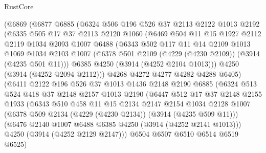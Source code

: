 \begin{lexlean}{RustCore}
\begin{coremodule}
        (@6869
          (@6877
            @6885
            (@6324
              @506
              @196
              @526
              @37
              @2113
              @2122
              @1013
              @2192
              (@6335
                @505
                @17
                @37
                @2113
                @2120
                @1060
                (@6469
                  @504
                  @11
                  @15
                  @1927
                  @2112
                  @2119
                  @1034
                  @2093
                  @1007
                  @6488
                  (@6343
                    @502
                    @117
                    @11
                    @14
                    @2109
                    @1013
                    @1069
                    @1034
                    @2103
                    @1007
                    (@6378 @501 @2109 (@4229 (@4230 @2109)) (@3914 (@4235 @501 @11)))
                    @6385
                    @4250
                    (@3914 (@4252 @2104 @1013)))
                  @4250
                  (@3914 (@4252 @2094 @2112)))
                @4268
                @4272
                @4277
                @4282
                @4288
                @6405)
              (@6411
                @2122
                @196
                @526
                @37
                @1013
                @1436
                @2148
                @2190
                @6885
                (@6324
                  @513
                  @524
                  @418
                  @37
                  @2148
                  @2157
                  @1013
                  @2190
                  (@6447
                    @512
                    @17
                    @37
                    @2148
                    @2155
                    @1933
                    (@6343
                      @510
                      @458
                      @11
                      @15
                      @2134
                      @2147
                      @2154
                      @1034
                      @2128
                      @1007
                      (@6378 @509 @2134 (@4229 (@4230 @2134)) (@3914 (@4235 @509 @11)))
                      (@6476 @2140 @1007 @6488 @6385 @4250 (@3914 (@4252 @2141 @1013)))
                      @4250
                      (@3914 (@4252 @2129 @2147)))
                    @6504
                    @6507
                    @6510
                    @6514
                    @6519
                    @6525)

\end{coremodule}
\end{lexlean}
